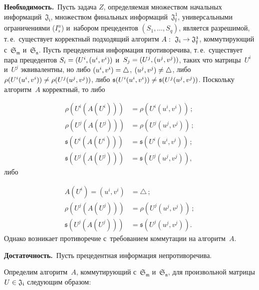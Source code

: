\begin{multicols}{2}
\smallskip


\noindent
\textbf{Необходимость.}\ Пусть задача $Z$, определяемая множеством 
начальных информаций~$\mathfrak{J_i}$, множеством финальных 
информаций~$\mathfrak{J_{f}^1}$, универсальными ограничениями ($I_s^u$) и~набором 
прецедентов  $(S_1,\ldots,S_q)$, является разрешимой, т.\,е.\ существует корректный 
подходящий алгоритм $A:~\mathfrak{J_i} \hm\rightarrow \mathfrak{J_f^1}$, 
коммутирующий с~$\mathfrak{S_m}$ и~$\mathfrak{S_n}$. Пусть прецедентная 
информация противоречива, т.\,е.\ существует пара прецедентов $S_i \hm= (U^i, 
(u^i,v^i))$ и~$S_j\hm=(U^j, (u^j,v^j))$, таких что матрицы~$U^i$ и~$U^j$ 
эквивалентны, но либо $(u^{i},v^{i})\hm = \triangle$, $(u^{j},v^{j})\hm\ne 
\triangle$, либо $\rho(U^{i}(u^{i},v^{i}))\hm\ne \rho(U^{j}(u^{j},v^{j}))$, либо
$\mathfrak{s}(U^{i}(u^{i},v^{i}))\hm\ne \mathfrak{s}(U^{j}(u^{j},v^{j}))$. 
Поскольку алгоритм~$A$ корректный, то либо

\noindent
\begin{align*}
 \rho\left(U^i\left(A\left(U^i\right)\right)\right)&=\rho\left(U^i\left(u^i, v^i\right)\right)\,; \\
    \rho\left(U^j\left(A\left(U^j\right)\right)\right)&=\rho\left(U^j\left(u^j, v^j\right)\right)\,;\\ 
    \mathfrak{s}\left(U^i\left(A\left(U^i\right)\right)\right)&=  \mathfrak{s}
    \left(U^i\left(u^i, v^i\right)\right)\,;\\ 
    \mathfrak{s}\left(U^j\left(A\left(U^j\right)\right)\right)&=\mathfrak{s}\left(U^j\left(u^j, v^j\right)\right),
\end{align*}
 либо
 
\noindent
\begin{align*}
A\left(U^i\right)= \left(u^{i},v^{i}\right)&=\triangle\,;\\
\rho\left(U^j\left(A\left(U^j\right)\right)\right)&=\rho\left(U^j\left(u^j, v^j\right)\right)\,;\\ 
\mathfrak{s}\left(U^j\left(A\left(U^j\right)\right)\right)&=\mathfrak{s}\left(U^j\left(u^j, v^j\right)\right).
\end{align*}
 Однако возникает противоречие с~требованием коммутации на алгоритм~$A$.


\smallskip

\noindent
\textbf{Достаточность.}\ Пусть прецедентная информация непротиворечива.

Определим алгоритм~$A$, коммутирующий с~$\mathfrak{S_m}$ и~$\mathfrak{S_n}$, для 
произвольной матрицы $U \hm\in \mathfrak{J_i}$ сле\-ду\-ющим образом:


\end{multicols}
